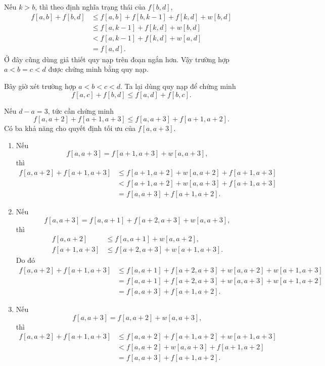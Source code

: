 \documentclass[11pt]{article}
\begin{document}
Nếu $k>b$, thì theo định nghĩa trạng thái của $f[b,d]$,
\[
\begin{aligned}
  f[a,b]+f[b,d]
  &\le f[a,b]+f[b,k-1]+f[k,d]+w[b,d]\\
  &\le f[a,k-1]+f[k,d]+w[b,d]\\
  &< f[a,k-1]+f[k,d]+w[a,d]\\
  &=f[a,d].
\end{aligned}
\]
Ở đây cũng dùng giả thiết quy nạp trên đoạn ngắn hơn. Vậy trường hợp
$a<b=c<d$ được chứng minh bằng quy nạp.

Bây giờ xét trường hợp $a<b<c<d$. Ta lại dùng quy nạp để chứng minh
\[
  f[a,c]+f[b,d]\le f[a,d]+f[b,c].
\]

Nếu $d-a=3$, tức cần chứng minh
\[
  f[a,a+2]+f[a+1,a+3]\le f[a,a+3]+f[a+1,a+2].
\]
Có ba khả năng cho quyết định tối ưu của $f[a,a+3]$.

\begin{enumerate}
  \item Nếu
  \[
    f[a,a+3]=f[a+1,a+3]+w[a,a+3],
  \]
  thì
  \[
  \begin{aligned}
    f[a,a+2]+f[a+1,a+3]
    &\le f[a+1,a+2]+w[a,a+2]+f[a+1,a+3]\\
    &< f[a+1,a+2]+w[a,a+3]+f[a+1,a+3]\\
    &= f[a,a+3]+f[a+1,a+2].
  \end{aligned}
  \]

  \item Nếu
  \[
    f[a,a+3]=f[a,a+1]+f[a+2,a+3]+w[a,a+3],
  \]
  thì
  \[
  \begin{aligned}
    f[a,a+2] &\le f[a,a+1]+w[a,a+2],\\
    f[a+1,a+3] &\le f[a+2,a+3]+w[a+1,a+3].
  \end{aligned}
  \]
  Do đó
  \[
  \begin{aligned}
    f[a,a+2]+f[a+1,a+3]
    &\le f[a,a+1]+f[a+2,a+3]+w[a,a+2]+w[a+1,a+3]\\
    &= f[a,a+1]+f[a+2,a+3]+w[a,a+3]+w[a+1,a+2]\\
    &= f[a,a+3]+f[a+1,a+2].
  \end{aligned}
  \]

  \item Nếu
  \[
    f[a,a+3]=f[a,a+2]+w[a,a+3],
  \]
  thì
  \[
  \begin{aligned}
    f[a,a+2]+f[a+1,a+3]
    &\le f[a,a+2]+f[a+1,a+2]+w[a+1,a+3]\\
    &< f[a,a+2]+w[a,a+3]+f[a+1,a+2]\\
    &= f[a,a+3]+f[a+1,a+2].
  \end{aligned}
  \]
\end{enumerate}
\end{document}
